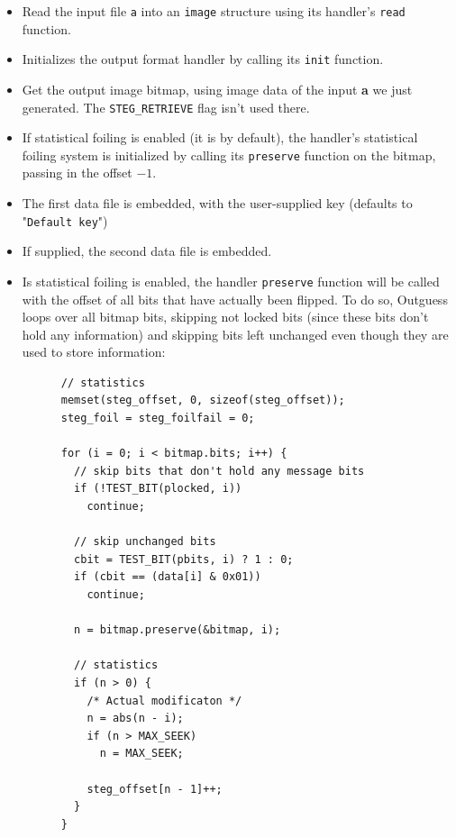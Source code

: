 \documentclass{article}
\begin{document}
\begin{itemize}
	\item Read the input file \texttt{a} into an \texttt{image} structure using its handler's \texttt{read} function.
	
	\item Initializes the output format handler by calling its \texttt{init} function.
	
	\item Get the output image bitmap, using image data of the input \textbf{a} we just generated. The \texttt{STEG\_RETRIEVE} flag isn't used there.

	\item If statistical foiling is enabled (it is by default), the handler's statistical foiling system is initialized by calling its \texttt{preserve} function on the bitmap, passing in the offset $-1$.
	
	\item The first data file is embedded, with the user-supplied key (defaults to "\texttt{Default key}")

	\item If supplied, the second data file is embedded.
	
	\item Is statistical foiling is enabled, the handler \texttt{preserve} function will be called with the offset of all bits that have actually been flipped. To do so, Outguess loops over all bitmap bits, skipping not locked bits (since these bits don't hold any information) and skipping bits left unchanged even though they are used to store information:
		\begin{verbatim}
      // statistics
      memset(steg_offset, 0, sizeof(steg_offset));
      steg_foil = steg_foilfail = 0;

      for (i = 0; i < bitmap.bits; i++) {
        // skip bits that don't hold any message bits
        if (!TEST_BIT(plocked, i))
          continue;
       	
        // skip unchanged bits
        cbit = TEST_BIT(pbits, i) ? 1 : 0;
        if (cbit == (data[i] & 0x01))
          continue;
	
        n = bitmap.preserve(&bitmap, i);

        // statistics
        if (n > 0) {
          /* Actual modificaton */
          n = abs(n - i);
          if (n > MAX_SEEK)
            n = MAX_SEEK;

          steg_offset[n - 1]++;
        }
      }
		\end{verbatim}


\end{itemize}
\end{document}

